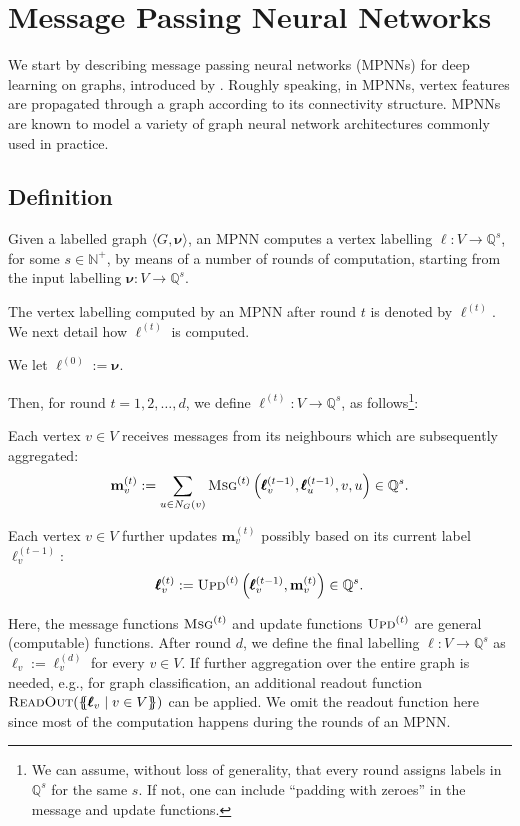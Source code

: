 
\section{Message Passing Neural Networks}\label{sec:MPNNs}
We start by describing message passing neural networks (MPNNs) for  deep
learning on graphs, introduced by \cite{GilmerSRVD17}. Roughly speaking, in
MPNNs, vertex features are propagated through a graph according to its
connectivity structure. MPNNs are known to model a variety of graph neural
network architectures commonly used in practice.

\subsection{Definition}
Given a labelled graph $\langle G,\pmb{\nu}\rangle$, an MPNN computes a vertex
labelling $\pmb{\ell}:V\to \mathbb{Q}^{s}$, for some $s\in\mathbb{N}^+$, by
means of a number of rounds of computation, starting from the input labelling
$\pmb{\nu}:V\to\mathbb{Q}^s$.

The vertex labelling computed by an MPNN after round $t$ is denoted by $\pmb{\ell}^{(t)}$. We next detail how $\pmb{\ell}^{(t)}$ is computed.
\begin{description}\setlength{\itemsep}{-0.4ex}
\item [Initialisation.]  We let $\pmb{\ell}^{(0)}:=\pmb{\nu}$.
\end{description}
Then, for round $t=1,2,\ldots,d$, we define $\pmb{\ell}^{(t)}:V\to\mathbb{Q}^{s}$, as follows\footnote{We can assume, without loss of generality, that every round assigns labels in $\mathbb{Q}^s$ for the same $s$. If not, one can include ``padding with zeroes'' in the message and update functions.}:
\begin{description}\setlength{\itemsep}{-0.4ex}
\item [Message Passing.] Each vertex $v\in V$ receives messages from its neighbours which are subsequently aggregated:
$$
\mathbf{m}^{(t)}_{v}:=\sum_{u\in N_G(v)}\textsc{Msg}^{(t)}\left(\pmb{\ell}^{(t-1)}_v,\pmb{\ell}^{(t-1)}_u,v,u\right)\in\mathbb{Q}^{s}.
$$
\item [Updating.] Each vertex $v\in V$ further updates $\mathbf{m}^{(t)}_{v}$ possibly based on its current label $\pmb{\ell}^{(t-1)}_v$:
$$
\pmb{\ell}^{(t)}_v:=\textsc{Upd}^{(t)}\left(\pmb{\ell}^{(t-1)}_v,\mathbf{m}^{(t)}_{v}\right)\in\mathbb{Q}^{s}.
$$
\end{description}
Here, the message functions $\textsc{Msg}^{(t)}$ and update functions
$\textsc{Upd}^{(t)}$ are general (computable) functions. After round $d$, we
define the final labelling $\pmb{\ell}:V\to\mathbb{Q}^{s}$ as
$\pmb{\ell}_v:=\pmb{\ell}^{(d)}_v$ for every $v\in V$. If further aggregation
over the entire graph is needed, e.g., for graph classification, an additional
readout function $\textsc{ReadOut}(\{\!\!\{\pmb{\ell}_v\mid v\in V\}\!\!\})$ can be
applied. We omit the readout function here since most of the computation
happens during the rounds of an MPNN.


